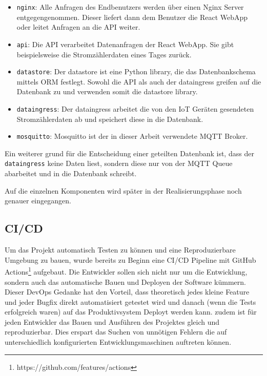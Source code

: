 \begin{itemize}
    \item \texttt{nginx}:
          Alle Anfragen des Endbenutzers werden über einen Nginx Server
          entgegengenommen. Dieser liefert dann dem Benutzer die React WebApp
          oder leitet Anfragen an die \ac{API} weiter.

    \item \texttt{api}:
          Die \ac{API} verarbeitet Datenanfragen der React WebApp. Sie gibt
          beispielsweise die Stromzählerdaten eines Tages zurück.

    \item \texttt{datastore}:
          Der datastore ist eine Python library, die das Datenbankschema mittels \ac{ORM} festlegt.
          Sowohl die \ac{API} als auch der dataingress greifen auf die Datenbank zu
          und verwenden somit die datastore library.

    \item \texttt{dataingress}:
          Der dataingress arbeitet die von den \ac{IoT} Geräten gesendeten
          Stromzählerdaten ab und speichert diese in die Datenbank.

    \item \texttt{mosquitto}:
          Mosquitto ist der in dieser Arbeit verwendete \ac{MQTT} Broker.
\end{itemize}

Ein weiterer grund für die Entscheidung einer geteilten Datenbank ist,
dass der \texttt{dataingress} keine Daten liest, sondern diese nur von
der \ac{MQTT} Queue abarbeitet und in die Datenbank schreibt.

Auf die einzelnen Komponenten wird später in der Realisierungsphase noch genauer
eingegangen.

\subsection{\ac{CI/CD}}

Um das Projekt automatisch Testen zu können und eine Reproduzierbare Umgebung zu bauen,
wurde bereits zu Beginn eine \ac{CI/CD} Pipeline mit GitHub Actions\footnote{https://github.com/features/actions}
aufgebaut.
Die Entwickler sollen sich nicht nur um die Entwicklung, sondern auch das automatische Bauen und Deployen der
Software kümmern. Dieser DevOps Gedanke hat den Vorteil, dass
theoretisch jedes kleine Feature und jeder Bugfix direkt automatisiert getestet
wird und danach (wenn die Tests erfolgreich waren) auf das Produktivsystem
Deployt werden kann. \cite{what_is_devops}
zudem ist für jeden Entwickler das Bauen und Ausführen des Projektes gleich und
reproduzierbar. Dies erspart das Suchen von unnötigen Fehlern die auf unterschiedlich
konfigurierten Entwicklungsmaschinen auftreten können.

